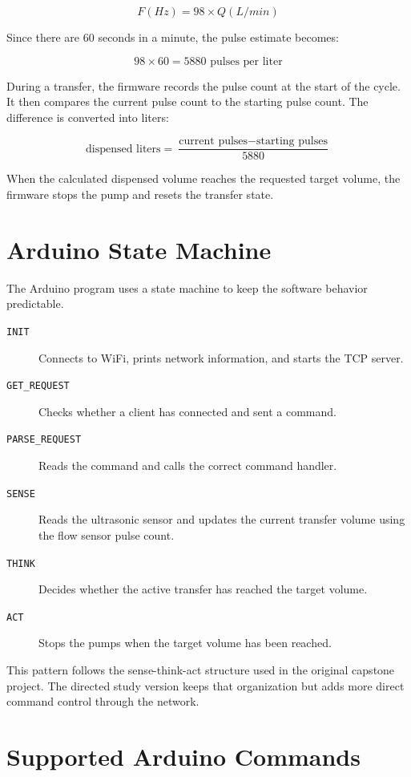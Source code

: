 \[
F(Hz) = 98 \times Q(L/min)
\]

Since there are 60 seconds in a minute, the pulse estimate becomes:

\[
98 \times 60 = 5880 \text{ pulses per liter}
\]

During a transfer, the firmware records the pulse count at the start of the cycle. It then compares the current pulse count to the starting pulse count. The difference is converted into liters:

\[
\text{dispensed liters} = \frac{\text{current pulses} - \text{starting pulses}}{5880}
\]

When the calculated dispensed volume reaches the requested target volume, the firmware stops the pump and resets the transfer state.

\section{Arduino State Machine}

The Arduino program uses a state machine to keep the software behavior predictable.

\begin{description}
    \item[\texttt{INIT}] Connects to WiFi, prints network information, and starts the TCP server.
    \item[\texttt{GET\_REQUEST}] Checks whether a client has connected and sent a command.
    \item[\texttt{PARSE\_REQUEST}] Reads the command and calls the correct command handler.
    \item[\texttt{SENSE}] Reads the ultrasonic sensor and updates the current transfer volume using the flow sensor pulse count.
    \item[\texttt{THINK}] Decides whether the active transfer has reached the target volume.
    \item[\texttt{ACT}] Stops the pumps when the target volume has been reached.
\end{description}

This pattern follows the sense-think-act structure used in the original capstone project. The directed study version keeps that organization but adds more direct command control through the network.

\section{Supported Arduino Commands}

